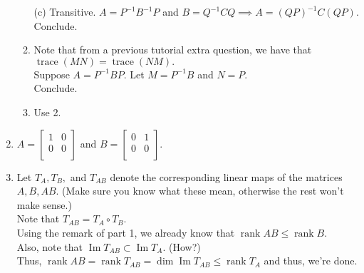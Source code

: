 \documentclass{article}
\newcommand{\rank}{\operatorname{rank}}
\renewcommand{\Im}{\operatorname{Im}}
\begin{document}
\begin{enumerate}
\begin{enumerate}[label = (\roman*)]
		(c) Transitive. $A = P^{-1}B^{-1}P$ and $B = Q^{-1}CQ \implies A = (QP)^{-1}C(QP).$\\
		Conclude.
		\item Note that from a previous tutorial extra question, we have that $\operatorname{trace}(MN) = \operatorname{trace}(NM).$\\
		Suppose $A = P^{-1}BP.$ Let $M = P^{-1}B$ and $N = P.$ \\
		Conclude.
		\item Use 2.
	\end{enumerate}
	\item $A = \begin{bmatrix}
		1 & 0\\
		0 & 0\\
	\end{bmatrix}$ and $B = \begin{bmatrix}
		0 & 1\\
		0 & 0\\
	\end{bmatrix}.$
	\item Let $T_A, T_B,$ and $T_{AB}$ denote the corresponding linear maps of the matrices $A, B, AB.$ (Make sure you know what these mean, otherwise the rest won't make sense.) \\
	Note that $T_{AB} = T_A\circ T_B.$\\
	Using the remark of part 1, we already know that $\rank AB \le \rank B.$\\
	Also, note that $\Im T_{AB} \subset \Im T_A.$ \hfill (How?)\\
	Thus, $\rank AB = \rank T_{AB} = \dim \Im T_{AB} \le \rank T_{A}$ and thus, we're done.

	\hrulefill


\end{enumerate}
\end{document}
